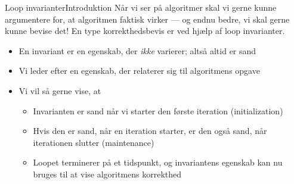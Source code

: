 \documentclass{beamer}
\begin{document}
\begin{frame}{Loop invarianter}{Introduktion}
    Når vi ser på algoritmer skal vi gerne kunne argumentere for, at algoritmen
    faktisk virker --- og endnu bedre, vi skal gerne kunne \alert{bevise} det!
    En type korrekthedsbevis er ved hjælp af \alert{loop invarianter}.

    \begin{itemize}[<+->]
        \item En \alert{invariant} er en egenskab, der \textit{ikke} varierer;
            altså altid er sand
        \item Vi leder efter en egenskab, der relaterer sig til algoritmens
            opgave
        \item Vi vil så gerne vise, at
            \begin{itemize}
                \item Invarianten er sand når vi starter den første iteration
                    (\alert{initialization})
                \item Hvis den er sand, når en iteration starter, er den også
                    sand, når iterationen slutter (\alert{maintenance})
                \item Loopet terminerer på et tidspunkt, og invariantens
                    egenskab kan nu bruges til at vise algoritmens korrekthed
            \end{itemize}
    \end{itemize}
\end{frame}
\end{document}
